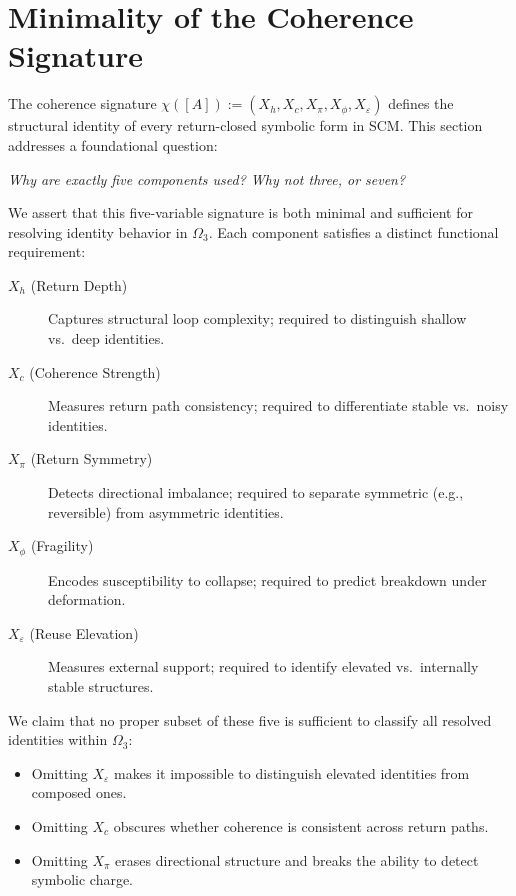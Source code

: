 \section{Minimality of the Coherence Signature} \label{minimality-of-the-coherence-signature}

The coherence signature $\chi([A]) := (X_h, X_c, X_\pi, X_\phi, X_\varepsilon)$ defines the structural identity of every return-closed symbolic form in SCM.  
This section addresses a foundational question:

\textit{Why are exactly five components used? Why not three, or seven?}

We assert that this five-variable signature is both minimal and sufficient for resolving identity behavior in $\Omega_3$.  
Each component satisfies a distinct functional requirement:

\begin{description}
  \item[$X_h$ (Return Depth)] Captures structural loop complexity; required to distinguish shallow vs.\ deep identities.
  \item[$X_c$ (Coherence Strength)] Measures return path consistency; required to differentiate stable vs.\ noisy identities.
  \item[$X_\pi$ (Return Symmetry)] Detects directional imbalance; required to separate symmetric (e.g., reversible) from asymmetric identities.
  \item[$X_\phi$ (Fragility)] Encodes susceptibility to collapse; required to predict breakdown under deformation.
  \item[$X_\varepsilon$ (Reuse Elevation)] Measures external support; required to identify elevated vs.\ internally stable structures.
\end{description}

We claim that no proper subset of these five is sufficient to classify all resolved identities within $\Omega_3$:

\begin{itemize}
  \item Omitting $X_\varepsilon$ makes it impossible to distinguish elevated identities from composed ones.
  \item Omitting $X_c$ obscures whether coherence is consistent across return paths.
  \item Omitting $X_\pi$ erases directional structure and breaks the ability to detect symbolic charge.
\end{itemize}

